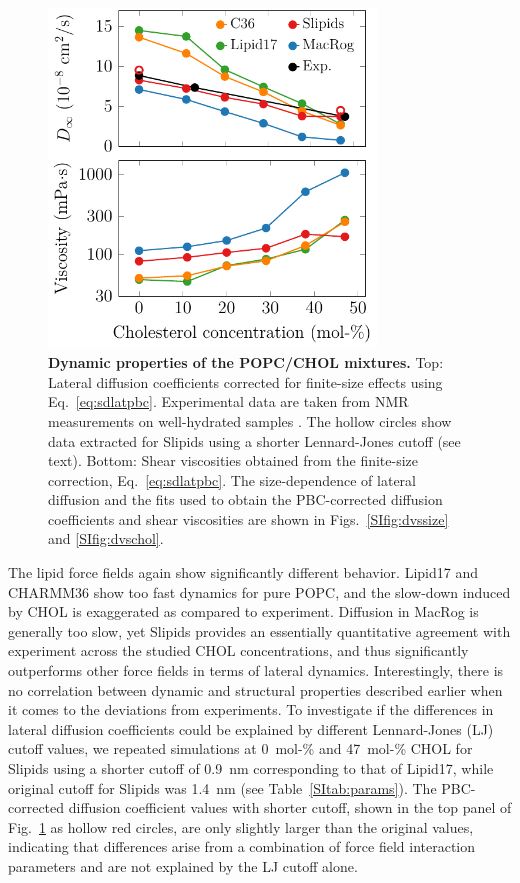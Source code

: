 \documentclass[journal=jctcce]{achemso}
\begin{document}
\begin{figure}[htb!]
  \centering
  \includegraphics[width=8.7cm]{../FIGS/dynamics.pdf}
  \caption{\label{fig:dynamics}%
  \textbf{Dynamic properties of the POPC/CHOL mixtures.}
  Top: Lateral diffusion coefficients corrected for finite-size effects using Eq.~\eqref{eq:sdlatpbc}. Experimental data are taken from NMR measurements on well-hydrated samples \cite{filippov2003influence,filippov2003effect}. The hollow circles show data extracted for Slipids using a shorter Lennard-Jones cutoff (see text).
  Bottom: Shear viscosities obtained from the finite-size correction, Eq.~\eqref{eq:sdlatpbc}.
  The size-dependence of lateral diffusion and the fits used to obtain the PBC-corrected diffusion coefficients and shear viscosities are shown in Figs.~\ref{SIfig:dvssize} and \ref{SIfig:dvschol}.
  }
\end{figure}

The lipid force fields again show significantly different behavior. Lipid17 and CHARMM36 show too fast dynamics for pure POPC, and the slow-down induced by CHOL is exaggerated as compared to experiment. Diffusion in MacRog is generally too slow, yet Slipids provides an essentially quantitative agreement with experiment across the studied CHOL concentrations, and thus significantly outperforms other force fields in terms of lateral dynamics. Interestingly, there is no correlation between dynamic and structural properties described earlier when it comes to the deviations from experiments. To investigate if the differences in lateral diffusion coefficients could be explained by different Lennard-Jones (LJ) cutoff values, we repeated simulations at 0~mol-\% and 47~mol-\% CHOL for Slipids using a shorter cutoff of 0.9~nm corresponding to that of Lipid17, while original cutoff for Slipids was 1.4~nm (see Table~\ref{SItab:params}). The PBC-corrected diffusion coefficient values with shorter cutoff, shown in the top panel of Fig.~\ref{fig:dynamics} as hollow red circles, are only slightly larger than the original values, indicating that differences arise from a combination of force field interaction parameters and are not explained by the LJ cutoff alone.
\end{document}
